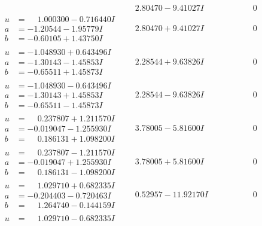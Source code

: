 \documentclass[1p]{elsarticle_modified}
\theoremstyle{definition}
\begin{document}
$$\begin{array}{c|c|c}
 & \phantom{-}2.80470 - 9.41027 I & \phantom{-0.000000 } 0 \\ \hline\begin{aligned}
u &= \phantom{-}1.000300 - 0.716440 I \\
a &= -1.20544 - 1.95779 I \\
b &= -0.60105 + 1.43750 I\end{aligned}
 & \phantom{-}2.80470 + 9.41027 I & \phantom{-0.000000 } 0 \\ \hline\begin{aligned}
u &= -1.048930 + 0.643496 I \\
a &= -1.30143 - 1.45853 I \\
b &= -0.65511 + 1.45873 I\end{aligned}
 & \phantom{-}2.28544 + 9.63826 I & \phantom{-0.000000 } 0 \\ \hline\begin{aligned}
u &= -1.048930 - 0.643496 I \\
a &= -1.30143 + 1.45853 I \\
b &= -0.65511 - 1.45873 I\end{aligned}
 & \phantom{-}2.28544 - 9.63826 I & \phantom{-0.000000 } 0 \\ \hline\begin{aligned}
u &= \phantom{-}0.237807 + 1.211570 I \\
a &= -0.019047 - 1.255930 I \\
b &= \phantom{-}0.186131 + 1.098200 I\end{aligned}
 & \phantom{-}3.78005 - 5.81600 I & \phantom{-0.000000 } 0 \\ \hline\begin{aligned}
u &= \phantom{-}0.237807 - 1.211570 I \\
a &= -0.019047 + 1.255930 I \\
b &= \phantom{-}0.186131 - 1.098200 I\end{aligned}
 & \phantom{-}3.78005 + 5.81600 I & \phantom{-0.000000 } 0 \\ \hline\begin{aligned}
u &= \phantom{-}1.029710 + 0.682335 I \\
a &= -0.204403 - 0.720463 I \\
b &= \phantom{-}1.264740 - 0.144159 I\end{aligned}
 & \phantom{-}0.52957 - 11.92170 I & \phantom{-0.000000 } 0 \\ \hline\begin{aligned}
u &= \phantom{-}1.029710 - 0.682335 I \\

\end{aligned}
\end{array}$$
\end{document}
